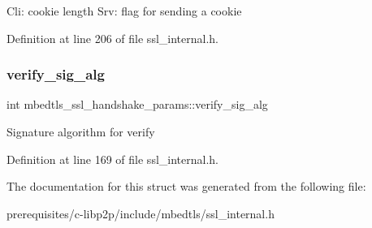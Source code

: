 Cli\+: cookie length Srv\+: flag for sending a cookie 

Definition at line 206 of file ssl\+\_\+internal.\+h.

\mbox{\label{structmbedtls__ssl__handshake__params_ab950ce283cc477ea1a246689ecd2a22d}} 
\subsubsection{\texorpdfstring{verify\+\_\+sig\+\_\+alg}{verify\_sig\_alg}}
{\footnotesize\ttfamily int mbedtls\+\_\+ssl\+\_\+handshake\+\_\+params\+::verify\+\_\+sig\+\_\+alg}

Signature algorithm for verify 

Definition at line 169 of file ssl\+\_\+internal.\+h.



The documentation for this struct was generated from the following file\+:\begin{DoxyCompactItemize}
\item 
prerequisites/c-\/libp2p/include/mbedtls/ssl\+\_\+internal.\+h\end{DoxyCompactItemize}
